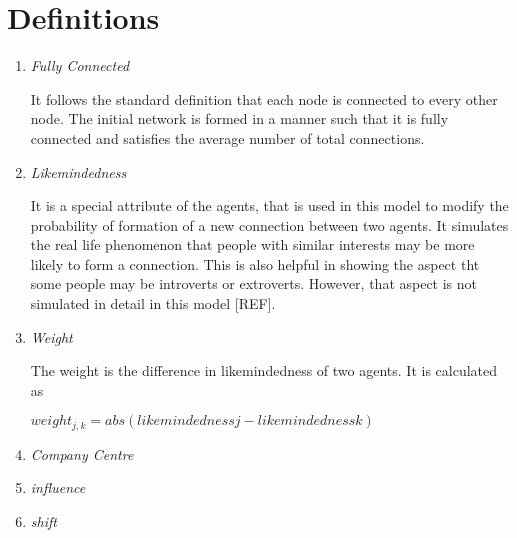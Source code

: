 \clearpage

\section{Definitions}
\begin{enumerate}
\item \emph{Fully Connected}

It follows the standard definition that each node is connected to every other node. The initial network is formed in a manner such that it is fully connected and satisfies the average number of total connections.

\item \emph{Likemindedness}

It is a special attribute of the agents, that is used in this model to modify the probability of formation of a new connection between two agents. It simulates the real life phenomenon that people with similar interests may be more likely to form a connection. This is also helpful in showing the aspect tht some people may be introverts or extroverts. However, that aspect is not simulated in detail in this model [REF].

\item \emph{Weight}

The weight is the difference in likemindedness of two agents. It is calculated as 

$weight_{j,k} = abs( likemindedness{j} - likemindedness{k} )$

\item \emph{Company Centre}
\item \emph{influence}
\item \emph{shift}
\end{enumerate}